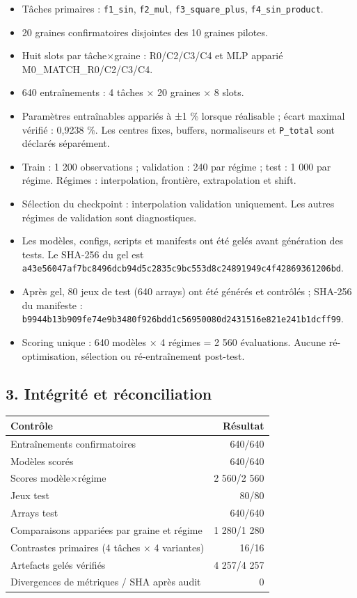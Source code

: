 \documentclass[
]{article}
\providecommand{\tightlist}{%
  \setlength{\itemsep}{0pt}\setlength{\parskip}{0pt}}
\begin{document}
\begin{itemize}
\tightlist
\item
  Tâches primaires : \texttt{f1\_sin}, \texttt{f2\_mul},
  \texttt{f3\_square\_plus}, \texttt{f4\_sin\_product}.
\item
  20 graines confirmatoires disjointes des 10 graines pilotes.
\item
  Huit slots par tâche×graine : R0/C2/C3/C4 et MLP apparié
  M0\_MATCH\_R0/C2/C3/C4.
\item
  640 entraînements : 4 tâches × 20 graines × 8 slots.
\item
  Paramètres entraînables appariés à ±1 \% lorsque réalisable ; écart
  maximal vérifié : 0,9238 \%. Les centres fixes, buffers, normaliseurs
  et \texttt{P\_total} sont déclarés séparément.
\item
  Train : 1 200 observations ; validation : 240 par régime ; test : 1
  000 par régime. Régimes : interpolation, frontière, extrapolation et
  shift.
\item
  Sélection du checkpoint : interpolation validation uniquement. Les
  autres régimes de validation sont diagnostiques.
\item
  Les modèles, configs, scripts et manifests ont été gelés avant
  génération des tests. Le SHA-256 du gel est
  \texttt{a43e56047af7bc8496dcb94d5c2835c9bc553d8c24891949c4f42869361206bd}.
\item
  Après gel, 80 jeux de test (640 arrays) ont été générés et contrôlés ;
  SHA-256 du manifeste :
  \texttt{b9944b13b909fe74e9b3480f926bdd1c56950080d2431516e821e241b1dcff99}.
\item
  Scoring unique : 640 modèles × 4 régimes = 2 560 évaluations. Aucune
  ré-optimisation, sélection ou ré-entraînement post-test.
\end{itemize}

\subsection{3. Intégrité et
réconciliation}\label{intuxe9grituxe9-et-ruxe9conciliation}

\begin{longtable}[]{@{}lr@{}}
\toprule\noalign{}
Contrôle & Résultat \\
\midrule\noalign{}
\endhead
\bottomrule\noalign{}
\endlastfoot
Entraînements confirmatoires & 640/640 \\
Modèles scorés & 640/640 \\
Scores modèle×régime & 2 560/2 560 \\
Jeux test & 80/80 \\
Arrays test & 640/640 \\
Comparaisons appariées par graine et régime & 1 280/1 280 \\
Contrastes primaires (4 tâches × 4 variantes) & 16/16 \\
Artefacts gelés vérifiés & 4 257/4 257 \\
Divergences de métriques / SHA après audit & 0 \\
\end{longtable}
\end{document}
